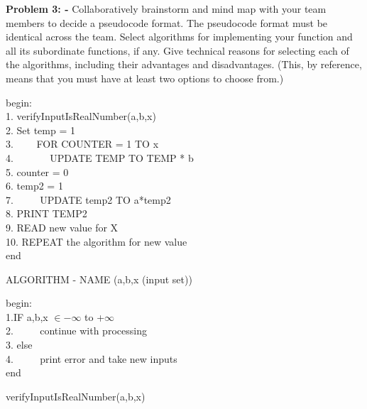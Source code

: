 \documentclass[a4paper, 11pt]{article}
\begin{document}
\textbf{Problem 3: - }Collaboratively brainstorm and mind map with your team members to decide a
pseudocode format. The pseudocode format must be identical across the team. Select
algorithms for implementing your function and all its subordinate functions, if any.
Give technical reasons for selecting each of the algorithms, including their advantages
and disadvantages. (This, by reference, means that you must have at least two options to
choose from.)\par

\begin{enumerate}


\begin{algorithm}
begin: \\
1. verifyInputIsRealNumber(a,b,x)\\
2. Set temp = 1 \\ 
3. $\hspace{2em}$FOR COUNTER = 1 TO x \\
4. $\hspace{3em}$ UPDATE TEMP TO TEMP * b\\
5. counter = 0\\
6. temp2 = 1\\
7. $\hspace{2em}$ UPDATE temp2 TO a*temp2\\
8. PRINT TEMP2 \\
9. READ new value for X\\
10. REPEAT the algorithm for new value \\
end
\caption{ALGORITHM - NAME (a,b,x (input set))}
\end{algorithm}

\begin{algorithm}
begin:\\
1.IF  a,b,x $\in -\infty$  to  +$\infty$ \\
2. $\hspace{2em}$ continue with processing\\
3. else\\
4. $\hspace{2em}$ print error and take new inputs \\
end
\caption{verifyInputIsRealNumber(a,b,x)}
\end{algorithm}


\end{enumerate}
\end{document}
